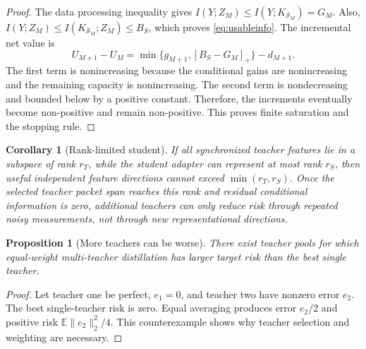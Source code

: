 \documentclass[10pt,twocolumn,a4paper]{article}
\newtheorem{proposition}{Proposition}
\newtheorem{corollary}{Corollary}
\newcommand{\E}{\mathbb{E}}
\newcommand{\cS}{\mathcal{S}}
\begin{document}
\begin{proof}
The data processing inequality gives \(I(Y;Z_M)\le I(Y;K_{\cS_M})=G_M\). Also, \(I(Y;Z_M)\le I(K_{\cS_M};Z_M)\le B_S\), which proves \cref{eq:usableinfo}. The incremental net value is
\begin{equation}
 U_{M+1}-U_M
 =\min\{g_{M+1},[B_S-G_M]_+\}-d_{M+1}.
\label{eq:netincrement}
\end{equation}
The first term is nonincreasing because the conditional gains are nonincreasing and the remaining capacity is nonincreasing. The second term is nondecreasing and bounded below by a positive constant. Therefore, the increments eventually become non-positive and remain non-positive. This proves finite saturation and the stopping rule.
\end{proof}

\begin{corollary}[Rank-limited student]
If all synchronized teacher features lie in a subspace of rank \(r_T\), while the student adapter can represent at most rank \(r_S\), then useful independent feature directions cannot exceed \(\min(r_T,r_S)\). Once the selected teacher packet span reaches this rank and residual conditional information is zero, additional teachers can only reduce risk through repeated noisy measurements, not through new representational directions.
\end{corollary}

\begin{proposition}[More teachers can be worse]
There exist teacher pools for which equal-weight multi-teacher distillation has larger target risk than the best single teacher.
\end{proposition}

\begin{proof}
Let teacher one be perfect, \(e_1=0\), and teacher two have nonzero error \(e_2\). The best single-teacher risk is zero. Equal averaging produces error \(e_2/2\) and positive risk \(\E\|e_2\|_2^2/4\). This counterexample shows why teacher selection and weighting are necessary.
\end{proof}
\end{document}
